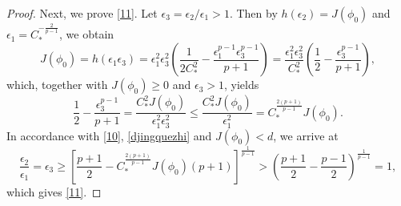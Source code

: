 \documentclass[11pt,a4paper]{article}
\numberwithin{equation}{section}
\numberwithin{remark}{section}
\begin{document}
\begin{proof}
Next, we prove \eqref{11}. Let $\epsilon_3=\epsilon_2/\epsilon_1>1$. Then by $h(\epsilon_2)=J(\phi_0)$ and $\epsilon_1=C_*^{-\frac{2}{p-1}}$, we obtain
\begin{equation*}
J(\phi_0)=h(\epsilon_1\epsilon_3)=\epsilon_1^2\epsilon_3^2\left(\frac{1}{2C_*^2}-\frac{\epsilon_1^{p-1}\epsilon_3^{p-1}}{p+1}\right)
=\frac{\epsilon_1^2\epsilon_3^2}{C_*^2}\left(\frac{1}{2}-\frac{\epsilon_3^{p-1}}{p+1}\right),
\end{equation*}
which, together with $J(\phi_0)\geq0$ and $\epsilon_3>1$, yields
\begin{equation}\label{10}
\frac{1}{2}-\frac{\epsilon_3^{p-1}}{p+1}=\frac{C_*^2J(\phi_0)}{\epsilon_1^2\epsilon_3^2}\leq\frac{C_*^2J(\phi_0)}{\epsilon_1^2}
=C_*^\frac{2(p+1)}{p-1}J(\phi_0).
\end{equation}
In accordance with \eqref{10}, \eqref{djingquezhi} and $J(\phi_0)<d$, we arrive at
\begin{equation*}
\frac{\epsilon_2}{\epsilon_1}=\epsilon_3\geq\left[\frac{p+1}{2}-C_*^{\frac{2(p+1)}{p-1}}J(\phi_0)(p+1)\right]^{\frac{1}{p-1}}
>\left(\frac{p+1}{2}-\frac{p-1}{2}\right)^{\frac{1}{p-1}}=1,
\end{equation*}
which gives \eqref{11}.
\end{proof}
\end{document}
